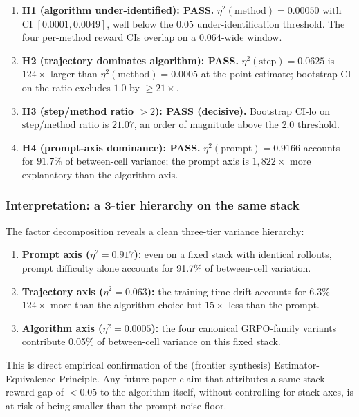 \documentclass{article}  \usepackage[preprint,nonatbib]{neurips_2026} \usepackage[numbers]{natbib}
\begin{document}
\begin{enumerate}
\item \textbf{H1 (algorithm under-identified): PASS.}
$\eta^2(\text{method}) = 0.00050$ with CI $[0.0001, 0.0049]$, well below the
$0.05$ under-identification threshold. The four per-method reward CIs
overlap on a $0.064$-wide window.

\item \textbf{H2 (trajectory dominates algorithm): PASS.}
$\eta^2(\text{step}) = 0.0625$ is $124\times$ larger than
$\eta^2(\text{method}) = 0.0005$ at the point estimate; bootstrap CI
on the ratio excludes $1.0$ by $\geq 21\times$.

\item \textbf{H3 (step/method ratio $> 2$): PASS (decisive).}
Bootstrap CI-lo on $\text{step}/\text{method}$ ratio is $21.07$, an
order of magnitude above the $2.0$ threshold.

\item \textbf{H4 (prompt-axis dominance): PASS.}
$\eta^2(\text{prompt}) = 0.9166$ accounts for $91.7\%$ of between-cell
variance; the prompt axis is $1{,}822\times$ more explanatory than the
algorithm axis.
\end{enumerate}

\subsubsection{Interpretation: a 3-tier hierarchy on the same stack}

The factor decomposition reveals a clean three-tier variance hierarchy:

\begin{enumerate}
\item \textbf{Prompt axis ($\eta^2 = 0.917$):} even on a fixed stack with
identical rollouts, prompt difficulty alone accounts for 91.7\% of
between-cell variation.
\item \textbf{Trajectory axis ($\eta^2 = 0.063$):} the training-time drift
accounts for 6.3\% -- $124\times$ more than the algorithm choice but
$15\times$ less than the prompt.
\item \textbf{Algorithm axis ($\eta^2 = 0.0005$):} the four canonical
GRPO-family variants contribute 0.05\% of between-cell variance on this
fixed stack.
\end{enumerate}

\noindent This is direct empirical confirmation of the (frontier synthesis)
Estimator-Equivalence Principle. Any future paper claim that attributes
a same-stack reward gap of $< 0.05$ to the algorithm itself, without
controlling for stack axes, is at risk of being smaller than the
prompt noise floor.
\end{document}
